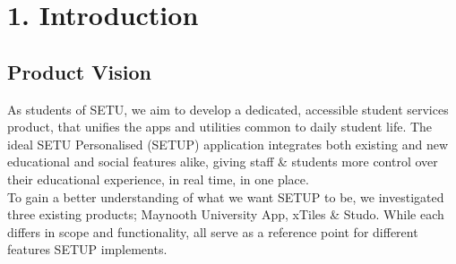 \section*{1. Introduction}

\subsection*{Product Vision}
As students of SETU, we aim to develop a dedicated, accessible student services product, that unifies the apps and utilities common to daily student life. The ideal SETU Personalised (SETUP) application integrates both existing and new educational and social features alike, giving staff \& students more control over their educational experience, in real time, in one place. \\

To gain a better understanding of what we want SETUP to be, we investigated three existing products; Maynooth University App, xTiles \& Studo. While each differs in scope and functionality, all serve as a reference point for different features SETUP implements. \\ 

